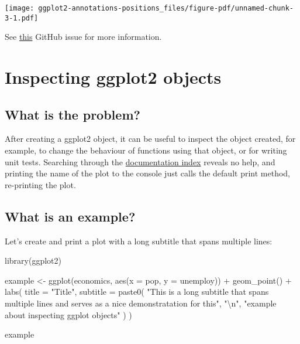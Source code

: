 \documentclass[
  letterpaper,
  DIV=11,
  numbers=noendperiod]{scrreprt}
\newenvironment{Shaded}{\begin{snugshade}}{\end{snugshade}}
\newcommand{\AttributeTok}[1]{\textcolor[rgb]{0.40,0.45,0.13}{#1}}
\newcommand{\FunctionTok}[1]{\textcolor[rgb]{0.28,0.35,0.67}{#1}}
\newcommand{\NormalTok}[1]{\textcolor[rgb]{0.00,0.23,0.31}{#1}}
\newcommand{\OtherTok}[1]{\textcolor[rgb]{0.00,0.23,0.31}{#1}}
\newcommand{\SpecialCharTok}[1]{\textcolor[rgb]{0.37,0.37,0.37}{#1}}
\newcommand{\StringTok}[1]{\textcolor[rgb]{0.13,0.47,0.30}{#1}}
\begin{document}
\texttt{[image: ggplot2-annotations-positions\_files/figure-pdf/unnamed-chunk-3-1.pdf]}

See \href{https://github.com/tidyverse/ggplot2/issues/4308}{this} GitHub
issue for more information.

\chapter{Inspecting ggplot2 objects}\label{inspecting-ggplot2-objects}

\section{What is the problem?}\label{what-is-the-problem-2}

After creating a ggplot2 object, it can be useful to inspect the object
created, for example, to change the behaviour of functions using that
object, or for writing unit tests. Searching through the
\href{https://ggplot2.tidyverse.org/reference/index.html}{documentation
index} reveals no help, and printing the name of the plot to the console
just calls the default print method, re-printing the plot.

\section{What is an example?}\label{what-is-an-example-2}

Let's create and print a plot with a long subtitle that spans multiple
lines:

\begin{Shaded}
\begin{Highlighting}[]
\FunctionTok{library}\NormalTok{(ggplot2)}

\NormalTok{example }\OtherTok{\textless{}{-}} \FunctionTok{ggplot}\NormalTok{(economics, }\FunctionTok{aes}\NormalTok{(}\AttributeTok{x =}\NormalTok{ pop, }\AttributeTok{y =}\NormalTok{ unemploy)) }\SpecialCharTok{+}
  \FunctionTok{geom\_point}\NormalTok{() }\SpecialCharTok{+}
  \FunctionTok{labs}\NormalTok{(}
    \AttributeTok{title =} \StringTok{"Title"}\NormalTok{,}
    \AttributeTok{subtitle =} \FunctionTok{paste0}\NormalTok{(}
      \StringTok{"This is a long subtitle that spans multiple lines and serves as a nice demonstratation for this"}\NormalTok{,}
      \StringTok{"}\SpecialCharTok{\textbackslash{}n}\StringTok{"}\NormalTok{,}
      \StringTok{"example about inspecting ggplot objects"}
\NormalTok{    )}
\NormalTok{  )}

\NormalTok{example}
\end{Highlighting}
\end{Shaded}
\end{document}
